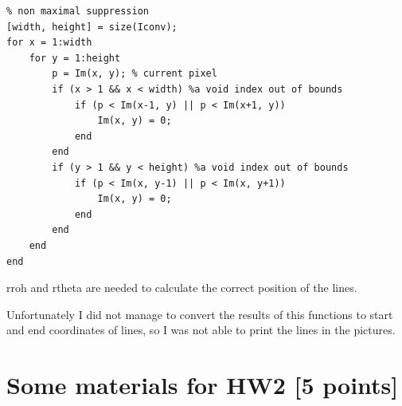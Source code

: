 \documentclass[12pt,a4paper]{article}
\begin{document}
\begin{lstlisting}
% non maximal suppression
[width, height] = size(Iconv);
for x = 1:width
    for y = 1:height
        p = Im(x, y); % current pixel
        if (x > 1 && x < width) %a void index out of bounds
            if (p < Im(x-1, y) || p < Im(x+1, y))
                Im(x, y) = 0;
            end
        end
        if (y > 1 && y < height) %a void index out of bounds
            if (p < Im(x, y-1) || p < Im(x, y+1))
                Im(x, y) = 0;
            end
        end
    end
end

\end{lstlisting}

rroh and rtheta are needed to calculate the correct position of the lines.


Unfortunately I did not manage to convert the results of this functions to start and end coordinates of lines, so I was not able to print the lines in the pictures.


\section{Some materials for HW2 [5 points]}

\nocite{*}


\end{document}
